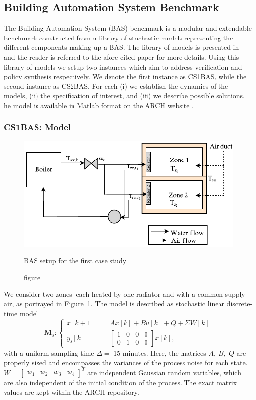 \subsection{Building Automation System Benchmark}
The Building Automation System (BAS) benchmark is a modular and extendable benchmark  constructed from a library of stochastic models representing the different components making up a BAS. The library of models is presented in~\cite{Cauchi18ADHS} and the reader is referred to the afore-cited paper for more details. Using this
library of models we setup two instances which aim to address  verification and policy synthesis respectively. We denote the first instance as CS1BAS, while the second instance as CS2BAS.
For each (i) we establish the dynamics of the models, (ii) the specification of interest, and (iii) we describe possible solutions.
he model is available in Matlab format on the ARCH website .

\subsubsection{CS1BAS: Model} 
\begin{figure}[h!]
    \centering
 	\includegraphics[width=0.5\columnwidth]{figures/Cs1.pdf}
 	\caption{figure}{BAS setup for the first case study}
 	\label{fig:cs1:setup}
 \end{figure}
 
We consider two zones, each heated by one radiator and with a common supply air, as portrayed in Figure~\ref{fig:cs1:setup}. 
The model is described as stochastic linear discrete-time model
\begin{equation}\label{mod:s}
	\textbf{M}_s: \begin{cases}
	x[k+1] &=Ax[k] + Bu[k] + Q + \Sigma W[k] \\ %
	y_s[k] &= \begin{bmatrix}
	1&0&0&0\\
	0&1&0&0\end{bmatrix} x[k], 
	\end{cases}
\end{equation}
with a uniform sampling time $\Delta=$ 15 minutes. Here, the matrices $A, \; B, \; Q $ are properly sized  and 
encompasses the variances of the process noise for each state. $W = \begin{bmatrix}w_1& w_2& w_3& w_4\end{bmatrix}^T$ are independent Gaussian random variables, which are also independent of the initial condition of the process. The exact matrix values are kept within the ARCH repository.

